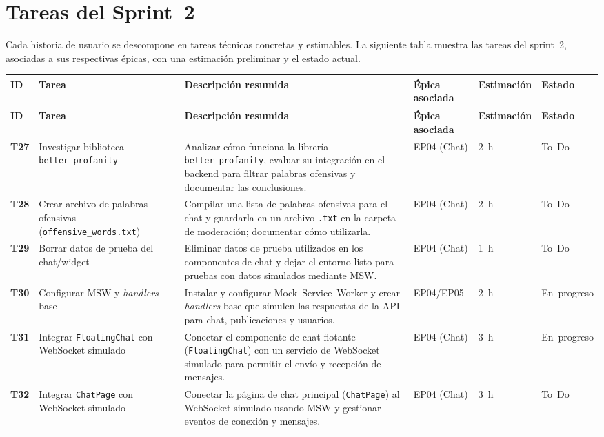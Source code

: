 \documentclass{article}
\begin{document}
\section*{Tareas del Sprint 2}
Cada historia de usuario se descompone en tareas técnicas concretas y estimables. La siguiente tabla muestra las tareas del sprint 2, asociadas a sus respectivas épicas, con una estimación preliminar y el estado actual.

\begin{longtable}{|l|p{5cm}|p{7cm}|p{3cm}|p{2cm}|p{2cm}|}
\hline
\textbf{ID} & \textbf{Tarea} & \textbf{Descripción resumida} & \textbf{Épica asociada} & \textbf{Estimación} & \textbf{Estado} \\
\hline
\endfirsthead
\hline
\textbf{ID} & \textbf{Tarea} & \textbf{Descripción resumida} & \textbf{Épica asociada} & \textbf{Estimación} & \textbf{Estado} \\
\hline
\endhead
\hline
\textbf{T27} & Investigar biblioteca \texttt{better‑profanity} & Analizar cómo funciona la librería \texttt{better‑profanity}, evaluar su integración en el backend para filtrar palabras ofensivas y documentar las conclusiones. & EP04 (Chat) & 2 h & To Do \\
\hline
\textbf{T28} & Crear archivo de palabras ofensivas (\texttt{offensive\_words.txt}) & Compilar una lista de palabras ofensivas para el chat y guardarla en un archivo \texttt{.txt} en la carpeta de moderación; documentar cómo utilizarla. & EP04 (Chat) & 2 h & To Do \\
\hline
\textbf{T29} & Borrar datos de prueba del chat/widget & Eliminar datos de prueba utilizados en los componentes de chat y dejar el entorno listo para pruebas con datos simulados mediante MSW. & EP04 (Chat) & 1 h & To Do \\
\hline
\textbf{T30} & Configurar MSW y \emph{handlers} base & Instalar y configurar Mock Service Worker y crear \emph{handlers} base que simulen las respuestas de la API para chat, publicaciones y usuarios. & EP04/EP05 & 2 h & En progreso \\
\hline
\textbf{T31} & Integrar \texttt{FloatingChat} con WebSocket simulado & Conectar el componente de chat flotante (\texttt{FloatingChat}) con un servicio de WebSocket simulado para permitir el envío y recepción de mensajes. & EP04 (Chat) & 3 h & En progreso \\
\hline
\textbf{T32} & Integrar \texttt{ChatPage} con WebSocket simulado & Conectar la página de chat principal (\texttt{ChatPage}) al WebSocket simulado usando MSW y gestionar eventos de conexión y mensajes. & EP04 (Chat) & 3 h & To Do \\

\end{longtable}
\end{document}
